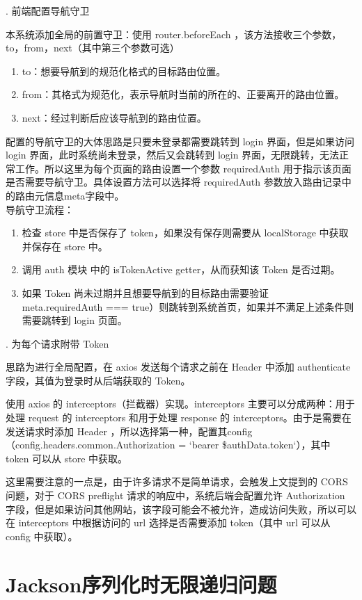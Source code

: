 . 前端配置导航守卫

本系统添加全局的前置守卫：使用  router.beforeEach ，该方法接收三个参数，to，from，next（其中第三个参数可选）
\begin{enumerate}
  \item to：想要导航到的规范化格式的目标路由位置。
  \item from：其格式为规范化，表示导航时当前的所在的、正要离开的路由位置。
  \item next：经过判断后应该导航到的路由位置。
\end{enumerate}
配置的导航守卫的大体思路是只要未登录都需要跳转到 login 界面，但是如果访问 login 界面，此时系统尚未登录，然后又会跳转到 login 界面，无限跳转，无法正常工作。所以这里为每个页面的路由设置一个参数 requiredAuth 用于指示该页面是否需要导航守卫。具体设置方法可以选择将 requiredAuth 参数放入路由记录中的路由元信息meta字段中。\\
导航守卫流程：
\begin{enumerate}
  \item 检查 store 中是否保存了 token，如果没有保存则需要从 localStorage 中获取并保存在 store 中。
  \item 调用 auth 模块 中的 isTokenActive getter，从而获知该 Token 是否过期。
  \item 如果 Token 尚未过期并且想要导航到的目标路由需要验证\\meta.requiredAuth === true）则跳转到系统首页，如果并不满足上述条件则需要跳转到 login 页面。
\end{enumerate}

. 为每个请求附带 Token

思路为进行全局配置，在 axios 发送每个请求之前在 Header 中添加 authenticate 字段，其值为登录时从后端获取的 Token。

使用 axios 的 interceptors（拦截器）实现。interceptors 主要可以分成两种：用于处理 request 的 interceptors 和用于处理 response 的 interceptors。由于是需要在发送请求时添加 Header ，所以选择第一种，配置其config（config.headers.common.Authorization = `bearer \${authData.token}`），其中 token 可以从 store 中获取。

这里需要注意的一点是，由于许多请求不是简单请求，会触发上文提到的 CORS 问题，对于 CORS preflight 请求的响应中，系统后端会配置允许 Authorization 字段，但是如果访问其他网站，该字段可能会不被允许，造成访问失败，所以可以在 interceptors 中根据访问的 url 选择是否需要添加 token（其中 url 可以从 config 中获取）。

\section{Jackson序列化时无限递归问题}

